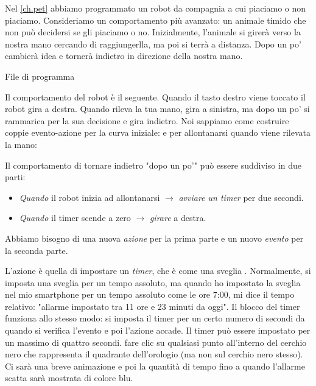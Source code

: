 \label{ch.time}

Nel \cref{ch.pet}  abbiamo programmato un robot da compagnia a cui piaciamo o non piaciamo.
Consideriamo un comportamento più avanzato: un animale timido che
non può decidersi se gli piaciamo o no. Inizialmente,
l'animale si girerà verso la nostra mano cercando di raggiungerlla, ma poi si terrà a distanza. Dopo un po'
cambierà idea e tornerà indietro in direzione
della nostra mano.

{\raggedleft \hfill File di programma }

Il comportamento del robot è il seguente. Quando il tasto destro viene toccato il robot gira a destra. Quando rileva la tua mano,
gira a sinistra, ma dopo un po' si rammarica per la sua decisione e gira
indietro. Noi sappiamo come costruire coppie evento-azione per la curva iniziale:
 e per allontanarsi quando viene rilevata la mano:

Il comportamento di tornare indietro "dopo un po'" può essere suddiviso in
due parti:

\begin{itemize}

\item \emph{Quando}  il robot inizia ad allontanarsi $\rightarrow$
\emph{avviare un timer} per due secondi.

\item \emph{Quando}  il timer scende a zero $\rightarrow$ \emph{girare}
a destra.

\end{itemize}

Abbiamo bisogno di una nuova \emph{azione} per la prima parte e un nuovo
\emph{evento} per la seconda parte.

L'azione è quella di impostare un \emph{timer}, che è come una sveglia
. Normalmente, si imposta una sveglia per un tempo assoluto,
ma quando ho impostato la sveglia nel mio smartphone per un tempo assoluto come le ore
7:00, mi dice il tempo relativo: "allarme impostato tra 11 ore e 23
minuti da oggi". Il blocco del timer funziona allo stesso modo: si imposta il
timer per un certo numero di secondi da quando si verifica l'evento e poi l'azione accade. Il timer può essere impostato per un massimo di quattro secondi. fare clic su
qualsiasi punto all'interno del cerchio nero che rappresenta il quadrante dell'orologio (ma non
sul cerchio nero stesso). Ci sarà una breve animazione e poi
la quantità di tempo fino a quando l'allarme scatta sarà mostrata di colore blu.

